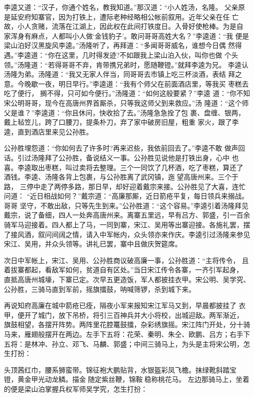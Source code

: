 李逵又道：“汉子，你通个姓名，教我知道。”那汉道：“小人姓汤，名隆。
父亲原是延安府知寨官，因为打铁上，遭际老种经略相公帐前叙用。近年父亲在任
亡故，小人贪赌，流落在江湖上，因此权在此间打铁度日。入骨好使枪棒。为是自
家浑身有麻点，人都叫小人做‘金钱豹子’。敢问哥哥高姓大名？”李逵道：“我
便是梁山泊好汉黑旋风李逵。”汤隆听了，再拜道：“多闻哥哥威名，谁想今日偶
然得遇。”李逵道：“你在这里，几时得发迹?不如跟我上梁山泊入伙，叫你也做
个头领。”汤隆道：“若得哥哥不弃，肯带携兄弟时，愿随鞭镫。”就拜李逵为兄。
李逵认汤隆为弟。汤隆道：“我又无家人伴当，同哥哥去市镇上吃三杯淡酒，表结
拜之意。今晚歇一夜，明日早行。”李逵道：“我有个师父在前面酒店里，等我买
枣糕去吃了便行，搁不得，只可如今便行。”汤隆道：“如何这般要紧？”李逵
道：“你不知宋公明哥哥，现今在高唐州界首厮杀，只等我这师父到来救应。”汤
隆道：“这个师父是谁？”李逵道：“你且休问，快收拾了去。”汤隆急急拴了包
裹、盘缠、银两，戴上毡笠儿，跨了口腰刀，提条朴刀，弃了家中破房旧屋，粗重
家火，跟了李逵，直到酒店里来见公孙胜。

公孙胜埋怨道：“你如何去了许多时?再来迟些，我依前回去了。”李逵不敢
做声回话。引过汤隆拜了公孙胜，备说结义一事。公孙胜见说他是打铁出身，心中
也喜。李逵取出枣糕，叫过卖将去整理。三个一同饮了几杯酒，吃了枣糕，算还了
酒钱。李逵、汤隆各背上包裹，与公孙胜离了武冈镇，迤望高唐州来。三个于路，
三停中走了两停多路，那日早，却好迎着戴宗来接。公孙胜见了大喜，连忙问道：
“近日相战如何？”戴宗道：“高廉那厮，近日箭疮平复，每日领兵来搦战。哥哥
坚守，不敢出敌，只等先生到来。”公孙胜道：“这个容易。”李逵引着汤隆拜见
戴宗，说了备细，四人一处奔高唐州来。离寨五里远，早有吕方、郭盛，引一百余
骑军马迎接着。四人都上了马，一同到寨，宋江、吴用等出寨迎接。各施礼罢，摆
了接风酒，叙问间阔之情，请入中军帐内，众头领亦来作庆。李逵引过汤隆来参见
宋江、吴用，并众头领等。讲礼已罢，寨中且做庆贺筵席。

次日中军帐上，宋江、吴用、公孙胜商议破高廉一事，公孙胜道：“主将传令，
且着拔寨都起，看敌军如何，贫道自有区处。”当日宋江传令各寨，一齐引军起身，
直抵高唐州城壕，下寨已定。次早五更造饭，军人都披挂衣甲。宋公明、吴学究、
公孙胜，三骑马直到军前，摇旗擂鼓，呐喊筛锣，杀到城下来。

再说知府高廉在城中箭疮已痊，隔夜小军来报知宋江军马又到，早晨都披挂了
衣甲，便开了城门，放下吊桥，将引三百神兵并大小将校，出城迎敌。两军渐近，
旗鼓相望，各摆开阵势。两阵里花腔鼍鼓擂，杂彩绣旗摇。宋江阵门开处，分十骑
马来，雁翅般摆开在两边。左手下五将：花荣、秦明、朱仝、欧鹏、吕方；右手下
五将：是林冲、孙立、邓飞、马麟、郭盛；中间三骑马上，为头是主将宋公明，怎
生打扮：

头顶茜红巾，腰系狮蛮带。锦征袍大鹏贴背，水银盔彩凤飞檐。抹绿靴斜踏宝
镫，黄金甲光动龙鳞。描金随定紫丝鞭，锦鞍稳称桃花马。
左边那骑马上，坐着的便是梁山泊掌握兵权军师吴学究，怎生打扮：

